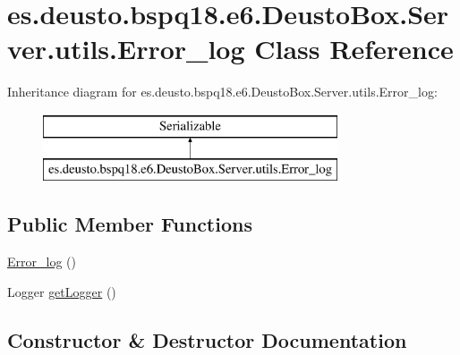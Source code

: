 \hypertarget{classes_1_1deusto_1_1bspq18_1_1e6_1_1_deusto_box_1_1_server_1_1utils_1_1_error__log}{}\section{es.\+deusto.\+bspq18.\+e6.\+Deusto\+Box.\+Server.\+utils.\+Error\+\_\+log Class Reference}
\label{classes_1_1deusto_1_1bspq18_1_1e6_1_1_deusto_box_1_1_server_1_1utils_1_1_error__log}
Inheritance diagram for es.\+deusto.\+bspq18.\+e6.\+Deusto\+Box.\+Server.\+utils.\+Error\+\_\+log\+:\begin{figure}[H]
\begin{center}
\leavevmode
\includegraphics[height=2.000000cm]{classes_1_1deusto_1_1bspq18_1_1e6_1_1_deusto_box_1_1_server_1_1utils_1_1_error__log}
\end{center}
\end{figure}
\subsection*{Public Member Functions}
\begin{DoxyCompactItemize}
\item 
\mbox{\hyperlink{classes_1_1deusto_1_1bspq18_1_1e6_1_1_deusto_box_1_1_server_1_1utils_1_1_error__log_ab48ada0f3948c676a1116dd30cfba960}{Error\+\_\+log}} ()
\item 
Logger \mbox{\hyperlink{classes_1_1deusto_1_1bspq18_1_1e6_1_1_deusto_box_1_1_server_1_1utils_1_1_error__log_a57a986e69bdc09c9927984eb2816976b}{get\+Logger}} ()
\end{DoxyCompactItemize}


\subsection{Constructor \& Destructor Documentation}
\mbox{\label{classes_1_1deusto_1_1bspq18_1_1e6_1_1_deusto_box_1_1_server_1_1utils_1_1_error__log_ab48ada0f3948c676a1116dd30cfba960}} 
